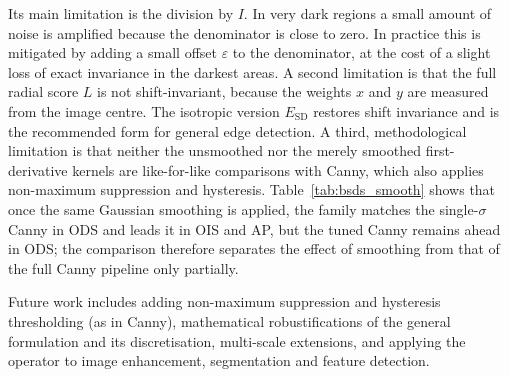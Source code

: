 \documentclass[conference]{IEEEtran}
\begin{document}
Its main limitation is the division by $I$.  In very dark regions a small
amount of noise is amplified because the denominator is close to zero.  In
practice this is mitigated by adding a small offset $\varepsilon$ to the
denominator, at the cost of a slight loss of exact invariance in the darkest
areas.  A second limitation is that the full radial score $L$ is not
shift-invariant, because the weights $x$ and $y$ are measured from the image
centre.  The isotropic version $E_{\mathrm{SD}}$ restores shift invariance
and is the recommended form for general edge detection.  A third, methodological
limitation is that neither the unsmoothed nor the merely smoothed first-derivative
kernels are like-for-like comparisons with Canny, which also applies non-maximum
suppression and hysteresis.  Table~\ref{tab:bsds_smooth} shows that once the same
Gaussian smoothing is applied, the family matches the single-$\sigma$ Canny in ODS and
leads it in OIS and AP, but the tuned Canny remains ahead in ODS; the comparison
therefore separates the effect of smoothing from that of the full Canny pipeline only
partially.

Future work includes adding non-maximum suppression and hysteresis
thresholding (as in Canny), mathematical robustifications of the general
formulation and its discretisation, multi-scale extensions, and applying the
operator to image enhancement, segmentation and feature detection.

\end{document}
